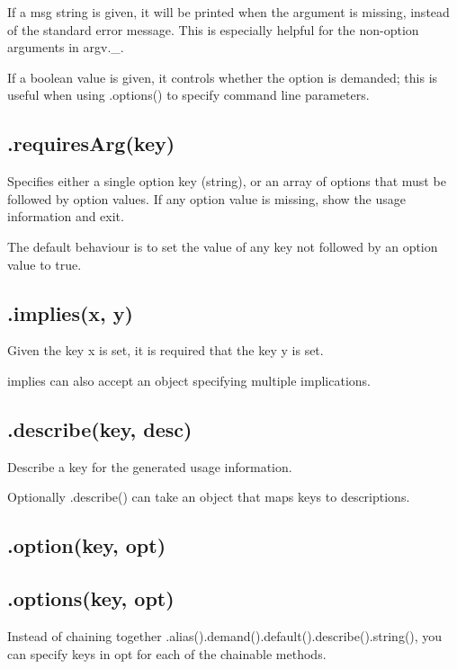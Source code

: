 If a {\ttfamily msg} string is given, it will be printed when the argument is missing, instead of the standard error message. This is especially helpful for the non-\/option arguments in {\ttfamily argv.\+\_\+}.

If a {\ttfamily boolean} value is given, it controls whether the option is demanded; this is useful when using {\ttfamily .options()} to specify command line parameters.

\subsection*{.requires\+Arg(key) }

Specifies either a single option key (string), or an array of options that must be followed by option values. If any option value is missing, show the usage information and exit.

The default behaviour is to set the value of any key not followed by an option value to {\ttfamily true}.

\subsection*{.implies(x, y) }

Given the key {\ttfamily x} is set, it is required that the key {\ttfamily y} is set.

implies can also accept an object specifying multiple implications.

\subsection*{.describe(key, desc) }

Describe a {\ttfamily key} for the generated usage information.

Optionally {\ttfamily .describe()} can take an object that maps keys to descriptions.

\subsection*{.option(key, opt) }

\subsection*{.options(key, opt) }

Instead of chaining together {\ttfamily .alias().demand().default().describe().string()}, you can specify keys in {\ttfamily opt} for each of the chainable methods.

